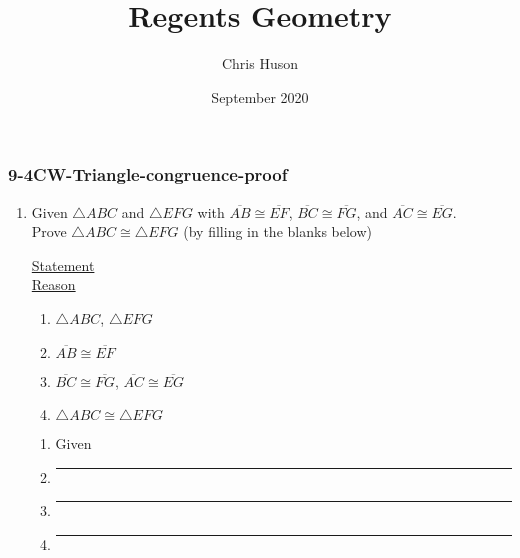 \documentclass[12pt, twoside]{article}
\title{Regents Geometry}
\author{Chris Huson}
\date{September 2020}
\begin{document}
\subsubsection*{9-4CW-Triangle-congruence-proof}
\begin{enumerate}
\item Given $\triangle ABC$ and $\triangle EFG$ with $\overline{AB} \cong \overline{EF}$, $\overline{BC} \cong \overline{FG}$, and $\overline{AC} \cong \overline{EG}$. \\Prove $\triangle ABC \cong \triangle EFG$ (by filling in the blanks below)\\[0.5cm]
    \begin{multicols}{2}
      \underline{Statement} \\
      \underline{Reason}
    \end{multicols}
    \begin{multicols}{2}
      \raggedcolumns
      \begin{enumerate}[label={\arabic*)}]
        \item $\triangle ABC$, $\triangle EFG$
        \item $\overline{AB} \cong \overline{EF}$
        \item $\overline{BC} \cong \overline{FG}$, $\overline{AC} \cong \overline{EG}$
        \item $\triangle ABC \cong \triangle EFG$
      \end{enumerate}
      \begin{enumerate}[label={\arabic*)}]
        \item Given
        \item \rule{4cm}{0.15mm}
        \item \rule{4cm}{0.15mm}
        \item \rule{4cm}{0.15mm}
      \end{enumerate}
    \end{multicols}


\end{enumerate}
\end{document}
